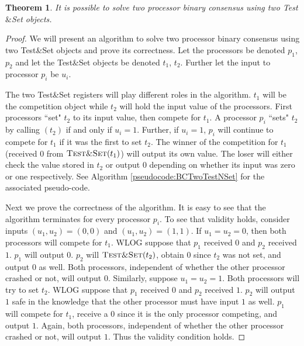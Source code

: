 \documentclass[11pt]{article}
\newcommand\testNsetF{\textsc{Test\&Set}}
\newtheorem{theorem}{Theorem}
\begin{document}
\begin{theorem}
It is possible to solve two processor binary consensus using two Test$\&$Set objects.
\end{theorem}
\begin{proof}
We will present an algorithm to solve two processor binary consensus using two Test\&Set objects and prove its correctness. Let the processors be denoted $p_1$, $p_2$ and let the Test\&Set objects be denoted $t_1$, $t_2$. Further let the input to processor $p_i$ be $u_i$. 

The two Test\&Set registers will play different roles in the algorithm. $t_1$ will be the competition object while $t_2$ will hold the input value of the processors. First processors ``set" $t_2$ to its input value, then compete for $t_1$. A processor $p_i$ ``sets" $t_2$ by calling  $(t_2)$ if and only if $u_i = 1$. Further, if $u_i = 1$, $p_i$ will continue to compete for $t_1$ if it was the first to set $t_2$. The winner of the competition for $t_1$ (received $0$ from $\testNsetF(t_1)$) will output its own value. The loser will either check the value stored in $t_2$ or output $0$ depending on whether its input was zero or one respectively.  See Algorithm \ref{pseudocode:BCTwoTestNSet} for the associated pseudo-code.

Next we prove the correctness of the algorithm. It is easy to see that the algorithm terminates for every processor $p_i$. To see that validity holds, consider inputs $(u_1, u_2) = (0,0)$ and $(u_1, u_2) = (1,1)$. If $u_1 = u_2 = 0$, then both processors will compete for $t_1$. WLOG suppose that $p_1$ received $0$ and $p_2$ received $1$. $p_1$ will output $0$. $p_2$ will $\testNsetF(t_2)$, obtain $0$ since $t_2$ was not set, and output $0$ as well. Both processors, independent of whether the other processor crashed or not, will output $0$. Similarly, suppose $u_1 = u_2 = 1$. Both processors will try to set $t_2$. WLOG suppose that $p_1$ received $0$ and $p_2$ received $1$. $p_2$ will output $1$ safe in the knowledge that the other processor must have input $1$ as well. $p_1$ will compete for $t_1$, receive a $0$ since it is the only processor competing, and output $1$. Again, both processors, independent of whether the other processor crashed or not, will output $1$. Thus the validity condition holds. 


\end{proof}
\end{document}
